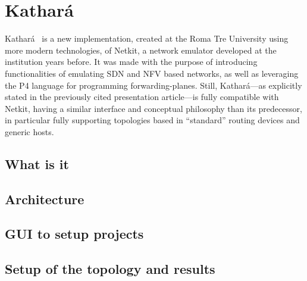 
\chapter{Kathará}
\label{ch:kathara}

Kathará~\cite{kathara} is a new implementation, created at the Roma Tre University using more modern technologies, of Netkit, a network emulator developed at the institution years before.
It was made with the purpose of introducing functionalities of emulating SDN and NFV based networks, as well as leveraging the P4 language for programming forwarding-planes.
Still, Kathará---as explicitly stated in the previously cited presentation article---is fully compatible with Netkit, having a similar interface and conceptual philosophy than its predecessor, in particular fully supporting topologies based in ``standard'' routing devices and generic hosts.

\section{What is it}
\label{sec:katharawhatis}

\section{Architecture}
\label{sec:katharaarchitecture}

\section{GUI to setup projects}
\label{sec:katharagui}

\section{Setup of the topology and results}
\label{sec:katharatopologyexample}

